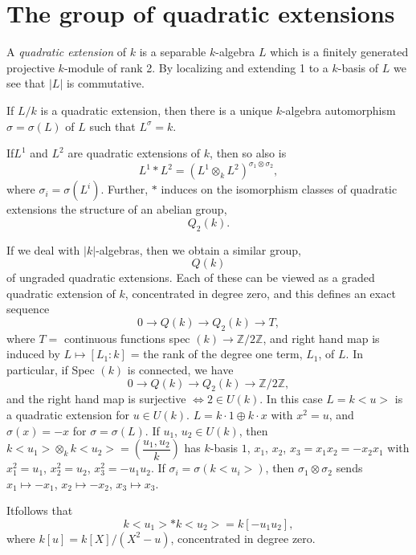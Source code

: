 \section{The group of quadratic extensions}\label{chap4:sec3} %

A \textit{quadratic extension} of $k$ is a separable $k$-algebra $L$
which is a finitely generated projective $k$-module of rank 2. By
localizing and extending 1 to a $k$-basis of $L$ we see that $|L|$
is commutative. 
 
\begin{prop}%
If $L/k$ is a quadratic extension, then there is a unique $k$-algebra
automorphism $\sigma = \sigma (L)$ of $L$ such that $L^\sigma = k$.  
\end{prop}

\begin{prop}%
If\pageoriginale $L^1$ and $L^2$ are quadratic extensions of $k$, then
so also is  
$$
L^1 \ast L^2 = (L^1 \otimes_k L^2)^{\sigma_1 \otimes \sigma_2},  
$$
where $\sigma _i = \sigma (L^i)$. Further, $*$ induces on the
isomorphism classes of quadratic extensions the structure of an abelian
group,  
$$
Q_2(k). 
$$
\end{prop}

If we deal with $|k|$-algebras, then we obtain a similar group, 
$$
Q(k)
$$
of ungraded quadratic extensions. Each of these can be viewed as a
graded quadratic extension of $k$, concentrated in degree zero, and
this defines an exact sequence  
$$
0 \to Q(k) \to Q_2 (k) \to T, 
$$
where $T=$ continuous functions spec $(k) \to \mathbb{Z} / 2
\mathbb{Z}$, and right hand map is induced by $L  \mapsto [ L_1 : k] $
= the rank of the degree one term, $L_1$, of $L$. In particular, if
Spec $(k)$ is connected, we have  
$$
0 \to Q (k) \to Q_2 (k) \to \mathbb{Z} / 2 \mathbb{Z}, 
$$ 
and the right hand map is surjective $\Leftrightarrow 2 \in U (k)$. In
this case $L = k < u >$ is a quadratic extension for $u \in U (k)$. $L
= k \cdot 1 \oplus k \cdot x$ with $x^2 = u$, and $\sigma (x) = - x $
for $\sigma = \sigma (L)$. If $u_1$, $u_2 \in U(k)$, then $k < u_1 >
\otimes_k k < u_2 > = \left(\dfrac{u_1, u_2}{k}\right)$ has $k$-basis
$1$, $x_1$, $x_2$, $x_3 = x_1 x_2 = - x_2 x_1$ with $x^2_1 = u _1$,
$x^2_2 = u _2$, $x^2_3 = -u _1u _2$. If $\sigma _i = \sigma (k
<u_i>)$, then $\sigma_1 \otimes \sigma_2$ sends $x_1 \mapsto - x_1$,
$x_2 \mapsto - x_2$, $x_3 \mapsto x_3$.  

It\pageoriginale follows that 
$$
k < u_1 > \ast k < u_2 > = k[-u_1 u_2],
$$
where $k[u]= k[X]/ (X^2-u)$, concentrated in degree zero.

